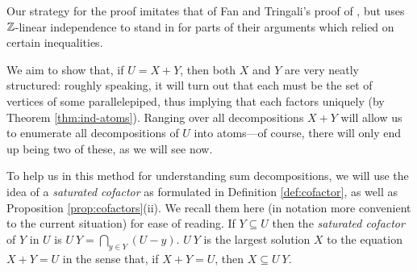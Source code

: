 Our strategy for the proof imitates that of Fan and Tringali's proof of \cite[Theorem 4.10]{fan-tringali18}, but uses $\mathbb{Z}$-linear independence to stand in for parts of their arguments which relied on certain inequalities.

We aim to show that, if $U = X+Y$, then both $X$ and $Y$ are very neatly structured: roughly speaking, it will turn out that each must be the set of vertices of some parallelepiped, thus implying that each factors uniquely (by Theorem \ref{thm:ind-atoms}).
Ranging over all decompositions $X+Y$ will allow us to enumerate all decompositions of $U$ into atoms---of course, there will only end up being two of these, as we will see now.

To help us in this method for understanding sum decompositions, we will use the idea of a \textit{saturated cofactor} as formulated in Definition \ref{def:cofactor}, as well as Proposition \ref{prop:cofactors}(ii).  
We recall them here (in notation more convenient to the current situation) for ease of reading.
If $Y \subseteq U$ then the \textit{saturated cofactor} of $Y$ in $U$ is $U\:Y = \bigcap_{y\in Y} (U-y)$.
$U\:Y$ is the largest solution $X$ to the equation $X+Y=U$ in the sense that, if $X+Y = U$, then $X \subseteq U\:Y$.

